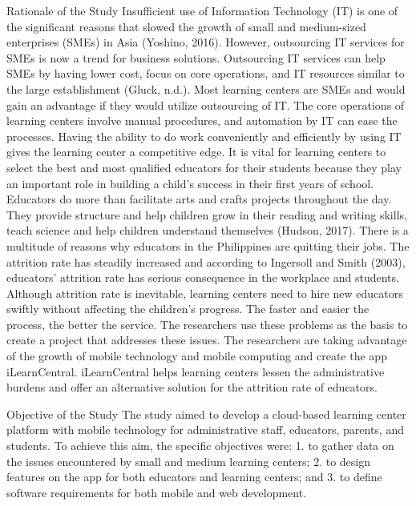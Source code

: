 Rationale of the Study
Insufficient use of Information Technology (IT) is one of the significant reasons that slowed the growth of small and medium-sized enterprises (SMEs) in Asia (Yoshino, 2016). However, outsourcing IT services for SMEs is now a trend for business solutions. Outsourcing IT services can help SMEs by having lower cost, focus on core operations, and IT resources similar to the large establishment (Gluck, n.d.).
Most learning centers are SMEs and would gain an advantage if they would utilize outsourcing of IT. The core operations of learning centers involve manual procedures, and automation by IT can ease the processes. Having the ability to do work conveniently and efficiently by using IT gives the learning center a competitive edge.
It is vital for learning centers to select the best and most qualified educators for their students because they play an important role in building a child’s success in their first years of school. Educators do more than facilitate arts and crafts projects throughout the day. They provide structure and help children grow in their reading and writing skills, teach science and help children understand themselves (Hudson, 2017). 
There is a multitude of reasons why educators in the Philippines are quitting their jobs. The attrition rate has steadily increased and according to Ingersoll and Smith (2003), educators' attrition rate has serious consequence in the workplace and students. Although attrition rate is inevitable, learning centers need to hire new educators swiftly without affecting the children’s progress. The faster and easier the process, the better the service.
The researchers use these problems as the basis to create a project that addresses these issues. The researchers are taking advantage of the growth of mobile technology and mobile computing and create the app iLearnCentral. iLearnCentral helps learning centers lessen the administrative burdens and offer an alternative solution for the attrition rate of educators.

Objective of the Study
	The study aimed to develop a cloud-based learning center platform with mobile technology for administrative staff, educators, parents, and students.
To achieve this aim, the specific objectives were:
1.	to gather data on the issues encountered by small and medium learning centers;
2.	to design features on the app for both educators and learning centers; and
3.	to define software requirements for both mobile and web development.

